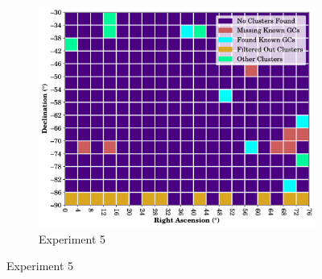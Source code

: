 \begin{figure}[H]
    \begin{subfigure}[b]{0.5\textwidth}
        \includegraphics[width=\textwidth]{./figures/rasters/grids/grid-run-05-a3.pdf}
        \caption{Experiment 5}
    \end{subfigure}
\end{figure}

